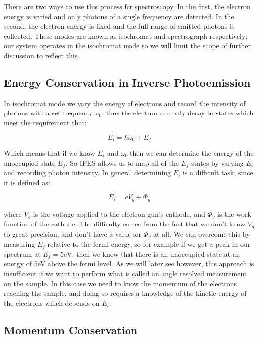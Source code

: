 There are two ways to use this process for spectroscopy. In the first, the electron energy is varied and only photons of a single frequency are detected. 
In the second, the electron energy is fixed and the full range of emitted photons is collected. These modes are known as isochromat and spectrograph respectively; our system operates in the isochromat 
mode so we will limit the scope of further discussion to reflect this. 

\subsection{Energy Conservation in Inverse Photoemission}

In isochromat mode we vary the energy of electrons and record the intensity of photons with a set frequency $\omega_0$, thus the electron can only decay to states which meet the requirement that:

\begin{equation}
    E_i = \hbar\omega_0 + E_f
\end{equation}

Which means that if we know $E_i$ and $\omega_0$ then we can determine the energy of the unoccupied state $E_f$. So IPES allows us to map all of the $E_f$ states by varying $E_i$ and 
recording photon intensity. In general determining $E_i$ is a difficult task, since it is defined as:

\begin{equation}\label{vg}
    E_i = eV_g + \Phi_g
\end{equation}

where $V_g$ is the voltage applied to the electron gun's cathode, and $\Phi_g$ is the work function of the cathode. The difficulty comes from the fact that we don't know $V_g$ to great 
precision, and don't have a value for $\Phi_g$ at all. We can overcome this by measuring $E_f$ relative to the fermi energy, so for example if we get a peak in our spectrum at 
$E_f = 5\textrm{eV}$, then we know that there is an unoccupied state at an energy of 5eV above the fermi level. As we will later see however, 
this approach is insufficient if we want to perform what is called an angle resolved measurement on the sample. In this case we need to know the 
momentum of the electrons reaching the sample, and doing so requires a knowledge of the kinetic energy of the electrons which depends on $E_i$. 

\subsection{Momentum Conservation}

